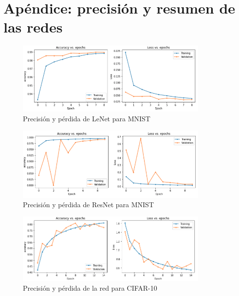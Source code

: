 \section{Apéndice: precisión y resumen de las redes}

\begin{figure}[h!]
    \centering
    \includegraphics[width=0.85\textwidth]{images/model_details/mnist_linear_good_train.png}
    \caption{Precisión y pérdida de LeNet para MNIST}
    \label{lenet prec}
\end{figure}

\vspace{7mm}

\begin{figure}[h!]
    \centering
    \includegraphics[width=0.85\textwidth]{images/model_details/mnist_nonlinear_good_train.png}
    \caption{Precisión y pérdida de ResNet para MNIST}
    \label{resnet prec}
\end{figure}

\vspace{7mm}

\begin{figure}[h!]
    \centering
    \includegraphics[width=0.85\textwidth]{images/model_details/cifar_train.png}
    \caption{Precisión y pérdida de la red para CIFAR-10}
    \label{cifar prec}
\end{figure}

